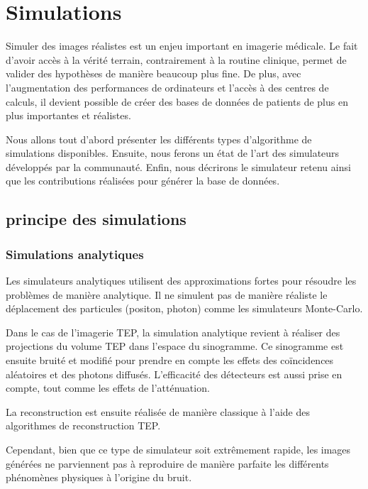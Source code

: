 \chapter{Simulations}

Simuler des images réalistes est un enjeu important en imagerie médicale. Le fait d'avoir accès à la vérité terrain, contrairement à la routine clinique, permet de valider des hypothèses de manière beaucoup plus fine. De plus, avec l'augmentation des performances de ordinateurs et l'accès à des centres de calculs, il devient possible de créer des bases de données de patients de plus en plus importantes et réalistes.

Nous allons tout d'abord présenter les différents types d'algorithme de simulations disponibles. Ensuite, nous ferons un état de l'art des simulateurs développés par la communauté. Enfin, nous décrirons le simulateur retenu ainsi que les contributions réalisées pour générer la base de données.

	\section{principe des simulations}

		\subsection{Simulations analytiques}

Les simulateurs analytiques utilisent des approximations fortes pour résoudre les problèmes de manière analytique. Il ne simulent pas de manière réaliste le déplacement des particules (positon, photon) comme les simulateurs Monte-Carlo.

Dans le cas de l'imagerie TEP, la simulation analytique revient à réaliser des projections du volume TEP dans l'espace du sinogramme. Ce sinogramme est ensuite bruité et modifié pour prendre en compte les effets des coïncidences aléatoires et des photons diffusés. L'efficacité des détecteurs est aussi prise en compte, tout comme les effets de l'atténuation. 

La reconstruction est ensuite réalisée de manière classique à l'aide des algorithmes de reconstruction TEP.


Cependant, bien que ce type de simulateur soit extrêmement rapide, les images générées ne parviennent pas à reproduire de manière parfaite les différents phénomènes physiques à l'origine du bruit.




